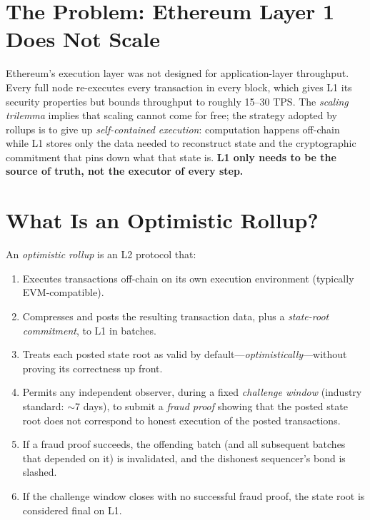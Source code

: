 \documentclass[11pt,letterpaper]{article}
\begin{document}
\section{The Problem: Ethereum Layer 1 Does Not Scale}

Ethereum's execution layer was not designed for application-layer throughput. Every full node re-executes every transaction in every block, which gives L1 its security properties but bounds throughput to roughly 15--30 TPS. The \emph{scaling trilemma} implies that scaling cannot come for free; the strategy adopted by rollups is to give up \emph{self-contained execution}: computation happens off-chain while L1 stores only the data needed to reconstruct state and the cryptographic commitment that pins down what that state is. \textbf{L1 only needs to be the source of truth, not the executor of every step.}

\section{What Is an Optimistic Rollup?}

An \emph{optimistic rollup} is an L2 protocol that:

\begin{enumerate}[leftmargin=*, itemsep=2pt]
    \item Executes transactions off-chain on its own execution environment (typically EVM-compatible).
    \item Compresses and posts the resulting transaction data, plus a \emph{state-root commitment}, to L1 in batches.
    \item Treats each posted state root as valid by default---\emph{optimistically}---without proving its correctness up front.
    \item Permits any independent observer, during a fixed \emph{challenge window} (industry standard: $\sim$7 days), to submit a \emph{fraud proof} showing that the posted state root does not correspond to honest execution of the posted transactions.
    \item If a fraud proof succeeds, the offending batch (and all subsequent batches that depended on it) is invalidated, and the dishonest sequencer's bond is slashed.
    \item If the challenge window closes with no successful fraud proof, the state root is considered final on L1.
\end{enumerate}
\end{document}
